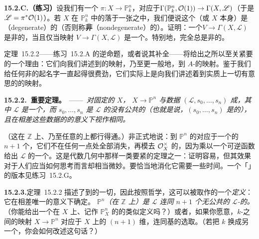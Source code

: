 \textbf{15.2.C.（练习）}\quad 设我们有一个\trMorphism{} $\pi\colon X\to\mathbb{P}^n_k$，对应于\trBasePointFree\trLinearSystem \allowbreak$\Gamma(\mathbb{P}^n_k,\mathcal{O}(1))\to\Gamma(X,\mathscr{L})$（于是 $\mathscr{L}=\pi^*\mathcal{O}(1)$）。若 $X$ 在 $\mathbb{P}^n_k$ 中的\trSchemeTheoreticImage{}落于一张\trHyperplane{}之中，我们便说这个\trLinearSystem（或 $X$ 本身）是\textbf{\trDegenerate}（degenerate）的（否则称\textbf{非\trDegenerate}（nondegenerate）的）。证明：一个\trBasePointFree\trLinearSystem $V\to\Gamma(X,\mathscr{L})$ 是非\trDegenerate{}的，当且仅当映射 $V\to\Gamma(X,\mathscr{L})$ 是一个\trInclusionMap。特别地，完全\trLinearSystem{}总是非\trDegenerate{}的。

\mbox{定理~15.2.2}——\mbox{练习~15.2.A} 的逆命题，或者说其补全——将给出\trLineBundle{}之所以至关紧要的一个理由：它们向我们讲述到\trProjectiveSpace{}的映射，乃至更一般地，到\trQuasiprojective{} $A$-\trScheme{}的映射。鉴于我们给任何非\trQuasiprojective{}的\trScheme{}起名字一直起得很费劲，它们实际上是向我们讲述着到实质上一切有意思的\trScheme{}的映射。

\textbf{15.2.2.\ 重要定理。}\ ——\ \emph{对固定的\trScheme{} $X$，\trMorphism{} $X\to\mathbb{P}^n$ 与数据 $(\mathscr{L},s_0,\dots,s_n)$ 成\trBijection，其中 $\mathscr{L}$ 是一个\trInvertibleSheaf，而 $s_0,\dots,s_n$ 是 $\mathscr{L}$ 的没有公共\trZeros{}的\trSection{}（也就是说，$(s_0,\dots,s_n)$ 是\trBasePointFree{}的），且在相差这些数据的\trIsomorphism{}的意义下视作相同。}

（这在 $\mathbb{Z}$ 上、乃至任意的\trBaseScheme{}上都行得通。）非正式地说：到 $\mathbb{P}^n$ 的\trMorphism{}对应于一个\trLineBundle{}的 $n+1$ 个\trSection，它们不在任何一点处全部消失，再模去 $\mathcal{O}_X^\times$ 的\trGlobalSections，因为乘以一个可逆函数给出 $\mathscr{L}$ 的一个\trAutomorphism。这是代数几何中那样一类要紧的定理之一：证明容易，但其效果对于人们应当如何思考而言却相当微妙。要恰当地消化它需要一些时间。一个「\trCoordinateFree」的版本见\mbox{练习~15.2.G}。

\textbf{15.2.3.}\quad \mbox{定理~15.2.2} 描述了到\trProjectiveSpace{}的一切\trMorphism，因此按照\trYoneda{}哲学，这可以被取作\trProjectiveSpace{}的一个\emph{定义}：它在相差唯一\trIsomorphism{}的意义下确定\trProjectiveSpace。\emph{\trProjectiveSpace{} $\mathbb{P}^n$（在 $\mathbb{Z}$ 上）是\trLineBundle{} $\mathscr{L}$ 连同 $n+1$ 个无公共\trZeros{}的 $\mathscr{L}$-\trSection{}的\trModuliSpace。}（你能给出一个在 $X$ 上、记作 $\mathbb{P}^n_X$ 的\trProjectiveSpace{}的类似定义吗？）或者，如果你愿意，$k$-\trScheme{}之间的映射 $X\to\mathbb{P}^n$ 对应于 $X$ 上的 $(n+1)$ 维\trBasePointFree\trLinearSystem，连同基的选取。（若把 $k$ 换成另一个\trRing，你会如何改述这句话？）

